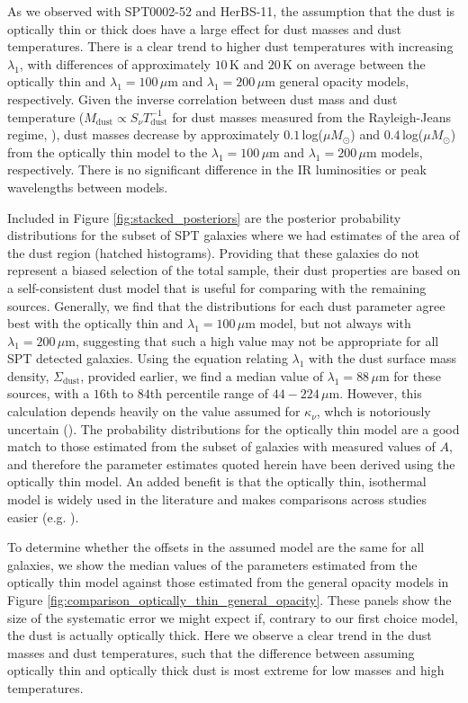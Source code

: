 As we observed with SPT0002-52 and HerBS-11, the assumption that the dust is optically thin or thick does have a large effect for dust masses and dust temperatures. There is a clear trend to higher dust temperatures with increasing $\lambda_1$, with differences of approximately $10\,$K and $20\,$K on average between the optically thin and $\lambda_1 = 100\,\mu$m and $\lambda_1 = 200\,\mu$m general opacity models, respectively. Given the inverse correlation between dust mass and dust temperature ($M_\textrm{dust} \propto S_\nu T_\textrm{dust}^{-1}$ for dust masses measured from the Rayleigh-Jeans regime, \citealt{Casey_2014b}), dust masses decrease by approximately $0.1\,$log($\mu M_\odot$) and $0.4\,$log($\mu M_\odot$) from the optically thin model to the $\lambda_1 = 100\,\mu$m and $\lambda_1 = 200\,\mu$m models, respectively. There is no significant difference in the IR luminosities or peak wavelengths between models.

Included in Figure \ref{fig:stacked_posteriors} are the posterior probability distributions for the subset of SPT galaxies where we had estimates of the area of the dust region (hatched histograms). Providing that these galaxies do not represent a biased selection of the total sample, their dust properties are based on a self-consistent dust model that is useful for comparing with the remaining sources. Generally, we find that the distributions for each dust parameter agree best with the optically thin and $\lambda_1 = 100\,\mu$m model, but not always with $\lambda_1 = 200\,\mu$m, suggesting that such a high value may not be appropriate for all SPT detected galaxies. Using the equation relating $\lambda_1$ with the dust surface mass density, $\Sigma_\textrm{dust}$, provided earlier, we find a median value of $\lambda_1 = 88\,\mu$m for these sources, with a $16$th to $84$th percentile range of $44 - 224\,\mu$m. However, this calculation depends heavily on the value assumed for $\kappa_\nu$, whch is notoriously uncertain (\citealt{Clark_2016}). The probability distributions for the optically thin model are a good match to those estimated from the subset of galaxies with measured values of $A$, and therefore the parameter estimates quoted herein have been derived using the optically thin model. An added benefit is that the optically thin, isothermal model is widely used in the literature and makes comparisons across studies easier (e.g. \citealt{Magdis_2012, Simpson_2017, Lamperti_2019, Dudzeviciute_2020, Valentino_2020a, daCunha_2021}).

To determine whether the offsets in the assumed model are the same for all galaxies, we show the median values of the parameters estimated from the optically thin model against those estimated from the general opacity models in Figure \ref{fig:comparison_optically_thin_general_opacity}. These panels show the size of the systematic error we might expect if, contrary to our first choice model, the dust is actually optically thick. Here we observe a clear trend in the dust masses and dust temperatures, such that the difference between assuming optically thin and optically thick dust is most extreme for low masses and high temperatures.

